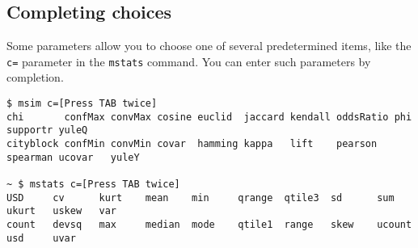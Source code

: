 \subsection{Completing choices\label{sect:bash_comp_items}}
Some parameters allow you to choose one of several predetermined items, like the \verb|c=| parameter in the \verb|mstats| command. You can enter such parameters by completion.

\begin{Verbatim}[baselinestretch=0.7,frame=single]
$ msim c=[Press TAB twice]
chi       confMax convMax cosine euclid  jaccard kendall oddsRatio phi      supportr yuleQ
cityblock confMin convMin covar  hamming kappa   lift    pearson   spearman ucovar   yuleY

~ $ mstats c=[Press TAB twice]
USD     cv      kurt    mean    min     qrange  qtile3  sd      sum     ukurt   uskew   var
count   devsq   max     median  mode    qtile1  range   skew    ucount  usd     uvar

\end{Verbatim}

%

